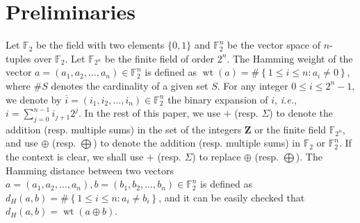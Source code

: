 \documentclass{article}
\newcommand{\Z}{\mathbf{Z}}
\newcommand{\F}{\mathbb{F}}
\newcommand{\0}{\textbf{0}}
\newcommand{\1}{\textbf{1}}
\newcommand{\wt}{\operatorname{wt}}
\theoremstyle{plain}
\begin{document}
\section{Preliminaries}
    Let $\F_2$ be the field with two elements $\{0,1\}$ and $\F_2^n$ be the vector space of $n$-tuples over $\F_2$.
    Let $\F_{2^n}$ be the finite field of order $2^n$.
    The Hamming weight of the vector $a=(a_1,a_2,\dots,a_n)\in\F_2^n$ is defined as $\wt(a)=\#\left\{ 1\le i\le n:a_i\ne 0 \right\}$, where $\#S$ denotes the cardinality of a given set $S$.
    For any integer $0\le i \le 2^n-1$, we denote by $\overline{i}=(i_1,i_2,\dots,i_n)\in\F_2^n$ the binary expansion of $i$, \emph{i.e.}, $i=\sum_{j=0}^{n-1}i_{j+1}2^j$.
    In the rest of this paper, we use $+$ (resp. $\Sigma$) to denote the addition (resp. multiple sums) in the set of the integers $\Z$ or the finite field $\F_{2^n}$, and use $\oplus$ (resp. $\bigoplus$) to denote the addition (resp. multiple sums) in $\F_2$ or $\F_2^n$.
    If the context is clear, we shall use $+$ (resp. $\Sigma$) to replace $\oplus$ (resp. $\bigoplus$).
    The Hamming distance between two vectors $a=(a_1,a_2,\dots,a_n),b=(b_1,b_2,\dots,b_n)\in\F_2^n$ is defined as $d_H(a,b)=\#\left\{ 1\le i\le n : a_i\ne b_i \right\}$, and it can be easily checked that $d_H(a,b)=\wt(a\oplus b)$.
\end{document}
